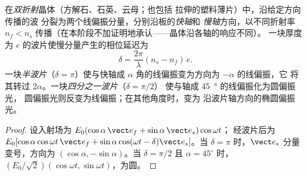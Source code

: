 \begin{proposition}[波片]\label{prop:b2:plane-waves-polarization:plates}
在\emph{双折射}晶体（方解石、石英、云母；也包括
拉伸的塑料薄片）中，沿给定方向传播的波
分裂为两个线偏振分量，分别沿板的\emph{快轴}和
\emph{慢轴}方向，以不同折射率 $n_f <
n_s$ 传播（在本阶段不加证明地承认——晶体沿各轴的响应不同）。
一块厚度为 $e$ 的波片使慢分量产生的相位延迟为
\[
\delta = \frac{2\pi}\lambda(n_s - n_f)\,e .
\]
一块\emph{半波片}（$\delta = \pi$）使与快轴成
$\alpha$ 角的线偏振变为方向为 $-\alpha$ 的线偏振，它
将其转过 $2\alpha$。一块\emph{四分之一波片}（$\delta = \pi/2$）
使与轴成 \qty{45}{\degree} 的线偏振化为圆偏振光，
圆偏振光则反变为线偏振；在其他角度时，变为
沿波片轴方向的椭圆偏振光。
\end{proposition}

\begin{proof}
设入射场为 $E_0(\cos\alpha\,\vect e_f + \sin\alpha\,\vect e_s)\cos\omega t$；
经波片后为 $E_0[\cos\alpha\cos\omega t\,\vect e_f + \sin\alpha\cos(\omega t - \delta)
\vect e_s]$。当 $\delta = \pi$ 时，$\vect e_s$ 分量变号，方向为
$(\cos\alpha, -\sin\alpha)$。当 $\delta = \pi/2$ 且 $\alpha = 45^\circ$ 时，$(E_0/\sqrt2)(\cos
\omega t, \sin\omega t)$，为圆。
\end{proof}

